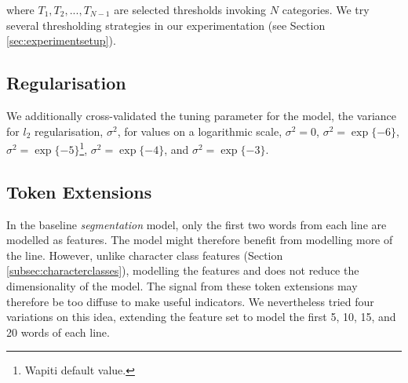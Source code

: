 where $T_1, T_2, ..., T_{N-1}$ are selected thresholds invoking $N$ categories. We try several thresholding strategies in our experimentation (see Section \ref{sec:experimentsetup}).

\subsection{Regularisation}

We additionally cross-validated the tuning parameter for the model, the variance for $l_2$ regularisation, $\sigma^2$, for values on a logarithmic scale, $\sigma^2 = 0$, $\sigma^2 = \exp\{-6\}$, $\sigma^2 = \exp\{-5\}$\footnote{Wapiti default value.}, $\sigma^2 = \exp\{-4\}$, and $\sigma^2 = \exp\{-3\}$.

\subsection{Token Extensions}

In the baseline \emph{segmentation} model, only the first two words from each line are modelled as features. The model might therefore benefit from modelling more of the line. However, unlike character class features (Section \ref{subsec:characterclasses}), modelling the features and does not reduce the dimensionality of the model. The signal from these token extensions may therefore be too diffuse to make useful indicators. We nevertheless tried four variations on this idea, extending the feature set to model the first 5, 10, 15, and 20 words of each line.
